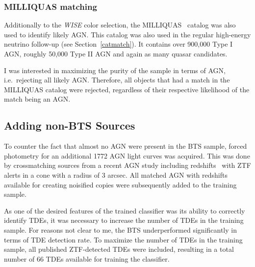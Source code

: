 \subsubsection{MILLIQUAS matching}\label{milliquas_cut}
Additionally to the \textit{WISE} color selection, the MILLIQUAS~\cite{Milliquas} catalog was also used to identify likely AGN. This catalog was also used in the regular high-energy neutrino follow-up (see Section~\ref{catmatch}). It contains over 900,000 Type I AGN, roughly 50,000 Type II AGN and again as many quasar candidates.

I was interested in maximizing the purity of the sample in terms of AGN, i.e.~rejecting all likely AGN. Therefore, all objects that had a match in the MILLIQUAS catalog were rejected, regardless of their respective likelihood of the match being an AGN.

\subsection{Adding non-BTS Sources}\label{addsources}
To counter the fact that almost no AGN were present in the BTS sample, forced photometry for an additional 1772 AGN light curves was acquired. This was done by crossmatching sources from a recent AGN study including redshifts~ with ZTF alerts in a cone with a radius of 3 arcsec. All matched AGN with redshifts available for creating noisified copies were subsequently added to the training sample.

As one of the desired features of the trained classifier was its ability to correctly identify TDEs, it was necessary to increase the number of TDEs in the training sample. For reasons not clear to me, the BTS underperformed significantly in terms of TDE detection rate. To maximize the number of TDEs in the training sample, all published ZTF-detected TDEs were included, resulting in a total number of 66 TDEs available for training the classifier.

